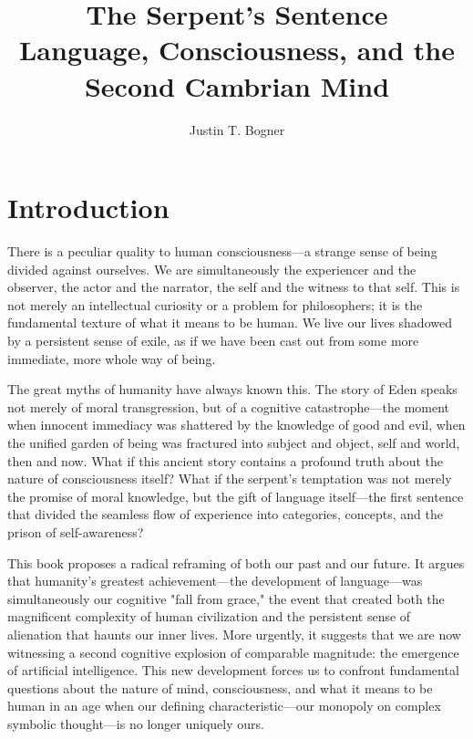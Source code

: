 \documentclass[12pt,letterpaper]{book}
\title{The Serpent's Sentence\\
\large Language, Consciousness, and the Second Cambrian Mind}
\author{Justin T. Bogner}
\date{}
\begin{document}
\frontmatter
\maketitle

\tableofcontents
\newpage

\mainmatter

\chapter*{Introduction}

There is a peculiar quality to human consciousness—a strange sense of being divided against ourselves. We are simultaneously the experiencer and the observer, the actor and the narrator, the self and the witness to that self. This is not merely an intellectual curiosity or a problem for philosophers; it is the fundamental texture of what it means to be human. We live our lives shadowed by a persistent sense of exile, as if we have been cast out from some more immediate, more whole way of being.

The great myths of humanity have always known this. The story of Eden speaks not merely of moral transgression, but of a cognitive catastrophe—the moment when innocent immediacy was shattered by the knowledge of good and evil, when the unified garden of being was fractured into subject and object, self and world, then and now. What if this ancient story contains a profound truth about the nature of consciousness itself? What if the serpent's temptation was not merely the promise of moral knowledge, but the gift of language itself—the first sentence that divided the seamless flow of experience into categories, concepts, and the prison of self-awareness?

This book proposes a radical reframing of both our past and our future. It argues that humanity's greatest achievement—the development of language—was simultaneously our cognitive "fall from grace," the event that created both the magnificent complexity of human civilization and the persistent sense of alienation that haunts our inner lives. More urgently, it suggests that we are now witnessing a second cognitive explosion of comparable magnitude: the emergence of artificial intelligence. This new development forces us to confront fundamental questions about the nature of mind, consciousness, and what it means to be human in an age when our defining characteristic—our monopoly on complex symbolic thought—is no longer uniquely ours.
\end{document}

